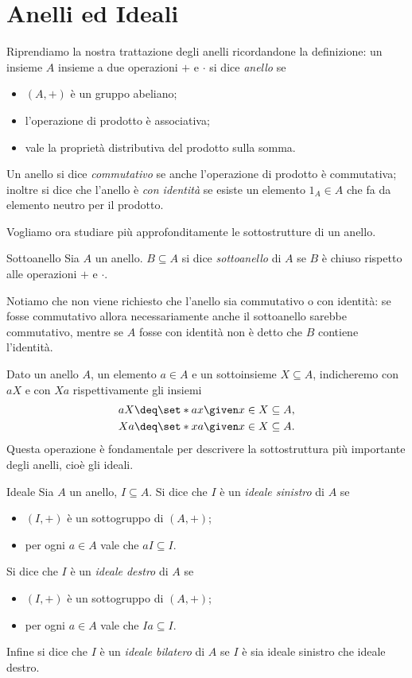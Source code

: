 \section{Anelli ed Ideali}

Riprendiamo la nostra trattazione degli anelli ricordandone la definizione: un insieme $A$ insieme a due operazioni $+$ e $\cdot$ si dice \emph{anello} se \begin{itemize}
    \item $(A, +)$ è un gruppo abeliano;
    \item l'operazione di prodotto è associativa;
    \item vale la proprietà distributiva del prodotto sulla somma.
\end{itemize} Un anello si dice \emph{commutativo} se anche l'operazione di prodotto è commutativa; inoltre si dice che l'anello è \emph{con identità} se esiste un elemento $1_A \in A$ che fa da elemento neutro per il prodotto.

Vogliamo ora studiare più approfonditamente le sottostrutture di un anello.
\begin{definition}
    {Sottoanello}{} Sia $A$ un anello. $B \subseteq A$ si dice \emph{sottoanello} di $A$ se $B$ è chiuso rispetto alle operazioni $+$ e $\cdot$.
\end{definition}

Notiamo che non viene richiesto che l'anello sia commutativo o con identità: se fosse commutativo allora necessariamente anche il sottoanello sarebbe commutativo, mentre se $A$ fosse con identità non è detto che $B$ contiene l'identità.

Dato un anello $A$, un elemento $a \in A$ e un sottoinsieme $X \subseteq A$, indicheremo con $aX$ e con $Xa$ rispettivamente gli insiemi \begin{align*}
    &aX \deq \set*{ax \given x \in X} \subseteq A,\\
    &Xa \deq \set*{xa \given x \in X} \subseteq A.
\end{align*} Questa operazione è fondamentale per descrivere la sottostruttura più importante degli anelli, cioè gli ideali.

\begin{definition}
    {Ideale}{} Sia $A$ un anello, $I \subseteq A$. Si dice che $I$ è un \emph{ideale sinistro} di $A$ se \begin{itemize}
        \item $(I, +)$ è un sottogruppo di $(A, +)$;
        \item per ogni $a \in A$ vale che $aI \subseteq I$.
    \end{itemize}
    Si dice che $I$ è un \emph{ideale destro} di $A$ se \begin{itemize}
        \item $(I, +)$ è un sottogruppo di $(A, +)$;
        \item per ogni $a \in A$ vale che $Ia \subseteq I$.
    \end{itemize}
    Infine si dice che $I$ è un \emph{ideale bilatero} di $A$ se $I$ è sia ideale sinistro che ideale destro.
\end{definition}

